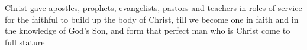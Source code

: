 
\lettrine{C}{}hrist gave apostles, prophets, evangelists, pastors and teachers in roles of service for the faithful to build up the body of Christ, till we become one in faith and in the knowledge of God’s Son, and form that perfect man who is Christ come to full stature